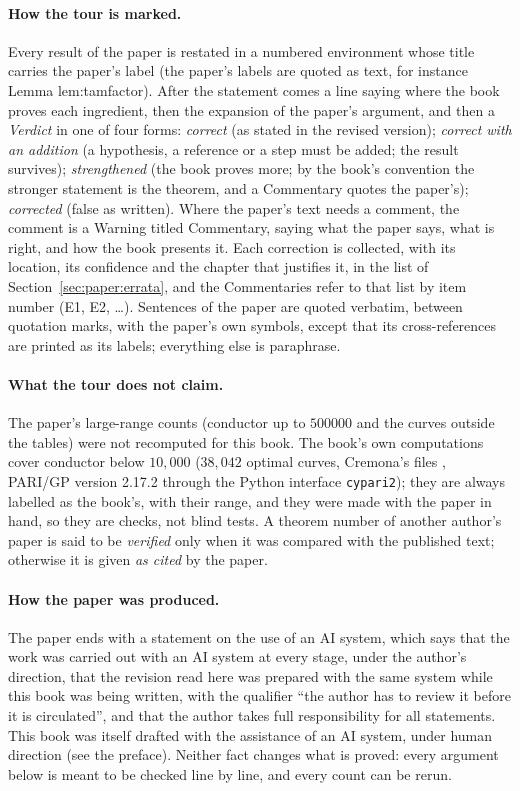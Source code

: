 \begin{sloppypar}
\paragraph{How the tour is marked.} Every result of the paper is restated in a numbered environment whose title carries the paper's label (the
paper's labels are quoted as text, for instance Lemma lem:tamfactor). After the statement comes a line saying where the book proves each
ingredient, then the expansion of the paper's argument, and then a \emph{Verdict} in one of four forms: \emph{correct} (as stated in the revised version);
\emph{correct with an addition} (a hypothesis, a reference or a step must be added; the result survives); \emph{strengthened} (the book proves more; by the
book's convention the stronger statement is the theorem, and a Commentary quotes the paper's); \emph{corrected} (false as written). Where the paper's
text needs a comment, the comment is a Warning titled Commentary, saying what the paper says, what is right, and how the book presents it. Each
correction is collected, with its location, its confidence and the chapter that justifies it, in the list of Section~\ref{sec:paper:errata}, and the
Commentaries refer to that list by item number (E1, E2, \dots). Sentences of the paper are quoted verbatim, between quotation marks, with the paper's
own symbols, except that its cross-references are printed as its labels; everything else is paraphrase.

\paragraph{What the tour does not claim.} The paper's large-range counts (conductor up to $500000$ and the curves outside the tables) were not
recomputed for this book. The book's own computations cover conductor below $10{,}000$ ($38{,}042$ optimal curves, Cremona's files \cite{ecdata}, PARI/GP
\cite{PARI} version 2.17.2 through the Python interface \texttt{cypari2}); they are always labelled as the book's, with their range, and they were made with
the paper in hand, so they are checks, not blind tests. A theorem number of another author's paper is said to be \emph{verified} only when it was
compared with the published text; otherwise it is given \emph{as cited} by the paper.

\paragraph{How the paper was produced.} The paper ends with a statement on the use of an AI system, which says that the work was carried out
with an AI system at every stage, under the author's direction, that the revision read here was prepared with the same system while this book was
being written, with the qualifier ``the author has to review it before it is circulated'', and that the author takes full responsibility for all statements. This book was itself drafted with the assistance of an AI system,
under human direction (see the preface). Neither fact changes what is proved: every argument below is meant to be checked line by line, and every
count can be rerun.


\end{sloppypar}
